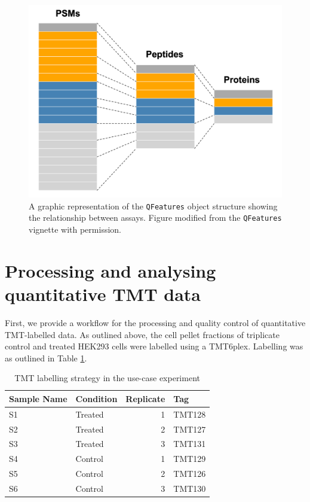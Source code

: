 \documentclass[9pt,a4paper,]{extarticle}
\begin{document}
\begin{figure}

{\centering \includegraphics[width=1\linewidth]{Images/qfeatures} 

}

\caption{A graphic representation of the \texttt{QFeatures} object structure showing the relationship between assays. Figure modified from the \texttt{QFeatures} \citep{QFeat} vignette with permission.}\label{fig:qfeatures}
\end{figure}

\hypertarget{processing-and-analysing-quantitative-tmt-data}{%
\section{Processing and analysing quantitative TMT data}\label{processing-and-analysing-quantitative-tmt-data}}

First, we provide a workflow for the processing and quality control of
quantitative TMT-labelled data. As outlined above, the cell pellet fractions of
triplicate control and treated HEK293 cells were labelled using a TMT6plex.
Labelling was as outlined in Table \ref{tab:table1}.

\begin{table}

\caption{\label{tab:table1}TMT labelling strategy in the use-case experiment}
\centering
\begin{tabular}[t]{l|l|r|l}
\hline
Sample Name & Condition & Replicate & Tag\\
\hline
S1 & Treated & 1 & TMT128\\
\hline
S2 & Treated & 2 & TMT127\\
\hline
S3 & Treated & 3 & TMT131\\
\hline
S4 & Control & 1 & TMT129\\
\hline
S5 & Control & 2 & TMT126\\
\hline
S6 & Control & 3 & TMT130\\
\hline
\end{tabular}
\end{table}
\end{document}
